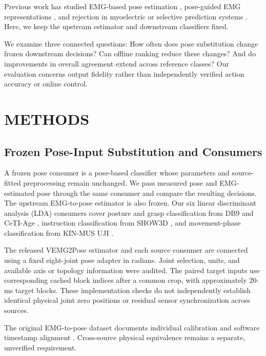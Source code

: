 Previous work has studied EMG-based pose estimation \cite{salter2024emg2pose}, pose-guided EMG representations \cite{cui2025cpep,cui2026embridge}, and rejection in myoelectric or selective prediction systems \cite{scheme2013confidence,ahkami2023rejection,geifman2019selectivenet}. Here, we keep the upstream estimator and downstream classifiers fixed.

We examine three connected questions: How often does pose substitution change frozen downstream decisions? Can offline ranking reduce these changes? And do improvements in overall agreement extend across reference classes? Our evaluation concerns output fidelity rather than independently verified action accuracy or online control.

\section{METHODS}\label{methods}


\subsection{Frozen Pose-Input Substitution and Consumers}\label{frozen-pose-input-substitution-and-consumers}
A frozen pose consumer is a pose-based classifier whose parameters and source-fitted preprocessing remain unchanged. We pass measured pose and EMG-estimated pose through the same consumer and compare the resulting decisions. The upstream EMG-to-pose estimator is also frozen. Our six linear discriminant analysis (LDA) consumers cover posture and grasp classification from DB9 \cite{jarquebou2020db9} and CeTI-Age \cite{muschter2023ceti}, instruction classification from SHOW3D \cite{rim2026show3d}, and movement-phase classification from KIN-MUS UJI \cite{jarquebou2019kinmus}.

The released VEMG2Pose estimator \cite{salter2024emg2pose} and each source consumer are connected using a fixed eight-joint pose adapter in radians. Joint selection, units, and available axis or topology information were audited. The paired target inputs use corresponding cached block indices after a common crop, with approximately 20-ms target blocks. These implementation checks do not independently establish identical physical joint zero positions or residual sensor synchronization across sources.

The original EMG-to-pose dataset documents individual calibration and software timestamp alignment \cite{salter2024emg2pose}. Cross-source physical equivalence remains a separate, unverified requirement.

